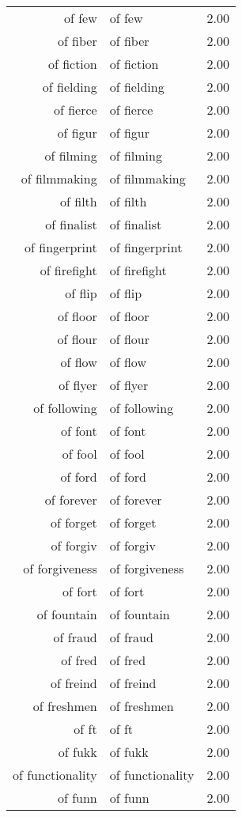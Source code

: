 \begin{table}[ht]
\begin{tabular}{rlr}
  of few & of few & 2.00 \\ 
  of fiber & of fiber & 2.00 \\ 
  of fiction & of fiction & 2.00 \\ 
  of fielding & of fielding & 2.00 \\ 
  of fierce & of fierce & 2.00 \\ 
  of figur & of figur & 2.00 \\ 
  of filming & of filming & 2.00 \\ 
  of filmmaking & of filmmaking & 2.00 \\ 
  of filth & of filth & 2.00 \\ 
  of finalist & of finalist & 2.00 \\ 
  of fingerprint & of fingerprint & 2.00 \\ 
  of firefight & of firefight & 2.00 \\ 
  of flip & of flip & 2.00 \\ 
  of floor & of floor & 2.00 \\ 
  of flour & of flour & 2.00 \\ 
  of flow & of flow & 2.00 \\ 
  of flyer & of flyer & 2.00 \\ 
  of following & of following & 2.00 \\ 
  of font & of font & 2.00 \\ 
  of fool & of fool & 2.00 \\ 
  of ford & of ford & 2.00 \\ 
  of forever & of forever & 2.00 \\ 
  of forget & of forget & 2.00 \\ 
  of forgiv & of forgiv & 2.00 \\ 
  of forgiveness & of forgiveness & 2.00 \\ 
  of fort & of fort & 2.00 \\ 
  of fountain & of fountain & 2.00 \\ 
  of fraud & of fraud & 2.00 \\ 
  of fred & of fred & 2.00 \\ 
  of freind & of freind & 2.00 \\ 
  of freshmen & of freshmen & 2.00 \\ 
  of ft & of ft & 2.00 \\ 
  of fukk & of fukk & 2.00 \\ 
  of functionality & of functionality & 2.00 \\ 
  of funn & of funn & 2.00 \\ 

\end{tabular}
\end{table}
